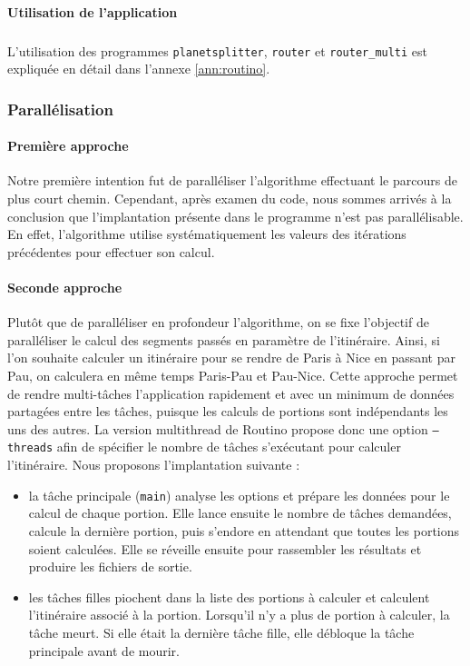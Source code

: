 \paragraph{Utilisation de l'application}
\subparagraph{}

L'utilisation des programmes \texttt{planetsplitter}, \texttt{router} et 
\texttt{router\_multi} est expliquée en détail dans l'annexe \ref{ann:routino}.

\subsubsection{Parallélisation}
\paragraph{Première approche}
Notre première intention fut de paralléliser l'algorithme effectuant le parcours
de plus court chemin. Cependant, après examen du code, nous sommes arrivés 
à la conclusion que l'implantation présente dans le programme n'est pas 
parallélisable. En effet, l'algorithme utilise systématiquement les valeurs 
des itérations précédentes pour effectuer son calcul.\\

\paragraph{Seconde approche}
Plutôt que de paralléliser en profondeur l'algorithme, on se fixe l'objectif de
paralléliser le calcul des segments passés en paramètre de l'itinéraire. Ainsi,
si l'on souhaite calculer un itinéraire pour se rendre de Paris à Nice en
passant par Pau, on calculera en même temps Paris-Pau et Pau-Nice. Cette
approche permet de rendre multi-tâches l'application rapidement et avec un
minimum de données partagées entre les tâches, puisque les calculs de portions
sont indépendants les uns des autres. La version multithread de Routino propose
donc une option \texttt{--threads} afin de spécifier le nombre de tâches 
s'exécutant pour calculer l'itinéraire. Nous proposons l'implantation suivante :
\begin{itemize}
\renewcommand{\labelitemi}{$\bullet$}
\item la tâche principale (\texttt{main}) analyse les options et prépare les
  données pour le calcul de chaque portion. Elle lance ensuite le nombre de
  tâches demandées, calcule la dernière portion, puis s'endore en attendant que
  toutes les portions soient calculées. Elle se réveille ensuite pour rassembler
  les résultats et produire les fichiers de sortie.
\item les tâches filles piochent dans la liste des portions à calculer et
  calculent l'itinéraire associé à la portion. Lorsqu'il n'y a plus de portion
  à calculer, la tâche meurt. Si elle était la dernière tâche fille, elle
  débloque la tâche principale avant de mourir.
\end{itemize}

